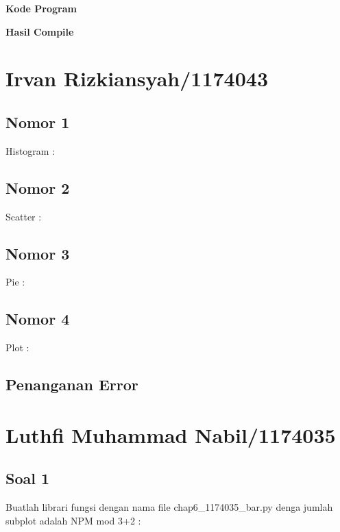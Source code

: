 \hfill \break
\textbf{Kode Program}



\hfill \break
\textbf{Hasil Compile}

\section{Irvan Rizkiansyah/1174043}
	\subsection{Nomor 1}
	Histogram :
		
	\subsection{Nomor 2}
	Scatter :
		
	\subsection{Nomor 3}
	Pie :
		
	\subsection{Nomor 4}
	Plot :
		
	\subsection{Penanganan Error}
		

\section{Luthfi Muhammad Nabil/1174035}
	\subsection{Soal 1}
	Buatlah librari fungsi dengan nama file chap6\_1174035\_bar.py denga jumlah subplot adalah NPM mod 3+2 : 

	
	
